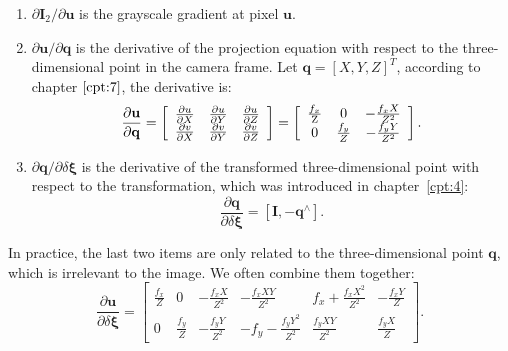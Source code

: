 \begin{enumerate}
	\item $ \partial \mathbf{I}_2 / \partial \mathbf{u} $ is the grayscale gradient at pixel $\mathbf{u}$.
	\item $ \partial \mathbf{u} / \partial \mathbf{q} $ is the derivative of the projection equation with respect to the three-dimensional point in the camera frame. Let $\mathbf{q}=[X,Y,Z]^T$, according to chapter $\ref{cpt:7}$, the derivative is:
	\begin{equation}
	\frac{{\partial \mathbf{u}}}{{\partial \mathbf{q}}} = \left[ {\begin{array}{*{20}{c}}
		{\frac{{\partial u}}{{\partial X}}}&{\frac{{\partial u}}{{\partial Y}}}&{\frac{{\partial u}}{{\partial Z}}}\\
		{\frac{{\partial v}}{{\partial X}}}&{\frac{{\partial v}}{{\partial Y}}}&{\frac{{\partial v}}{{\partial Z}}}
		\end{array}} \right] = \left[ {\begin{array}{*{20}{c}}
		{\frac{{{f_x}}}{{\rm{Z}}}}&0&{ - \frac{{{f_x}X}}{{{Z^2}}}}\\
		0&{\frac{{{f_y}}}{Z}}&{ - \frac{{{f_y}Y}}{{{Z^2}}}}
		\end{array}} \right].
	\end{equation}
	
	\item ${\partial \mathbf{q}}/{\partial \delta \boldsymbol{\xi} }$ is the derivative of the transformed three-dimensional point with respect to the transformation, which was introduced in chapter~\ref{cpt:4}:
	\begin{equation}
	\frac{{\partial \mathbf{q}}}{{\partial \delta \boldsymbol{\xi} }} = \left[ { \mathbf{I}, - {\mathbf{q}^ \wedge }} \right].
	\end{equation}
\end{enumerate}

In practice, the last two items are only related to the three-dimensional point $\mathbf{q}$, which is irrelevant to the image. We often combine them together:
\begin{equation}
\frac{{\partial \mathbf{u}}}{{\partial \delta \boldsymbol{\xi} }} = \left[ {\begin{array}{*{20}{c}}
	{\frac{{{f_x}}}{Z}}&0&{ - \frac{{{f_x}X}}{{{Z^2}}}}&{ - \frac{{{f_x}XY}}{{{Z^2}}}}&{{f_x} + \frac{{{f_x}{X^2}}}{{{Z^2}}}}&{ - \frac{{{f_x}Y}}{Z}}\\
	0&{\frac{{{f_y}}}{Z}}&{ - \frac{{{f_y}Y}}{{{Z^2}}}}&{ - {f_y} - \frac{{{f_y}{Y^2}}}{{{Z^2}}}}&{\frac{{{f_y}XY}}{{{Z^2}}}}&{\frac{{{f_y}X}}{Z}}
	\end{array}} \right].
\end{equation}

